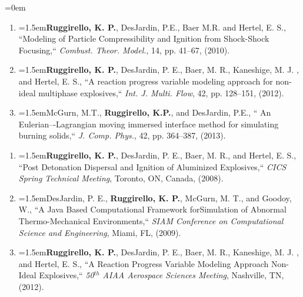 \documentclass{scrartcl}
\newcommand{\NewJPub}[6]{\noindent\hangindent=1.5em\hangafter=0\footnotesize #1, ``#2,`` \textit{#3}, #4, pp. #5, (#6). %
\vspace{0.em} \normalsize} %
\newcommand{\NewCPap}[5]{\noindent\hangindent=1.5em\hangafter=0\footnotesize #1, ``#2,`` \textit{#3}, #4, (#5). %
\vspace{0.em} \normalsize} %
\begin{document}
\begin{cv}{}
\begin{mdframed}[
  linecolor=white,%
  leftmargin =-0cm,
  rightmargin =+0cm,
]
\vspace{0.5em} %

\noindent\hangindent=0em\vspace{0.5em}
\begin{enumerate}
\itemsep0em
\item\NewJPub{\textbf{Ruggirello, K. P.}, DesJardin, P.E., Baer M.R. and Hertel, E. S.}{Modeling of Particle 
Compressibility and Ignition from Shock-Shock Focusing}{Combust. Theor. Model.}{14}{41--67}{2010}

\item\NewJPub{\textbf{Ruggirello, K. P.}, DesJardin, P. E., Baer, M. R., Kaneshige, M. J. , and Hertel, E. S.}{A reaction progress variable modeling approach for non-ideal multiphase explosives}{Int. J. Multi. Flow}{42}{128--151}{2012}

\item\NewJPub{McGurn, M.T., \textbf{Ruggirello, K.P.}, and DesJardin, P.E.}{ An Eulerian–-Lagrangian moving immersed interface method for simulating burning solids}{J. Comp. Phys.}{42}{364--387}{2013}
\end{enumerate}

\vspace{0.5em} %

\vspace{0.5em}

\begin{enumerate}
\itemsep0em
\item\NewCPap{\textbf{Ruggirello, K. P.}, DesJardin, P. E., Baer, M. R., and Hertel, E. S.}{Post Detonation Dispersal and Ignition of Aluminized Explosives}{CICS Spring Technical Meeting}{Toronto, ON, Canada}{2008}

\item\NewCPap{DesJardin, P. E., \textbf{Ruggirello, K. P.}, McGurn, M. T., and Goodoy, W.}{A Java Based Computational Framework for\newline Simulation of Abnormal Thermo-Mechanical Environments}{SIAM Conference on Computational Science and Engineering}{Miami, FL}{2009}

\item\NewCPap{\textbf{Ruggirello, K. P.}, DesJardin, P. E., Baer, M. R., Kaneshige, M. J. , and Hertel, E. S.}{A Reaction Progress Variable Modeling Approach Non-Ideal Explosives}{50$^{th}$ AIAA Aerospace Sciences Meeting}{Nashville, TN}{2012}


\end{enumerate}
\end{mdframed}
\end{cv}
\end{document}
